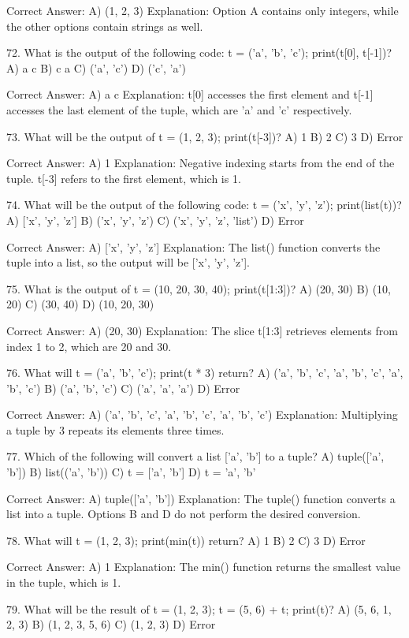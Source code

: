 Correct Answer: A) (1, 2, 3)
Explanation: Option A contains only integers, while the other options contain strings as well.

72. What is the output of the following code: t = ('a', 'b', 'c'); print(t[0], t[-1])?
A) a c
B) c a
C) ('a', 'c')
D) ('c', 'a')

Correct Answer: A) a c
Explanation: t[0] accesses the first element and t[-1] accesses the last element of the tuple, which are 'a' and 'c' respectively.

73. What will be the output of t = (1, 2, 3); print(t[-3])?
A) 1
B) 2
C) 3
D) Error

Correct Answer: A) 1
Explanation: Negative indexing starts from the end of the tuple. t[-3] refers to the first element, which is 1.

74. What will be the output of the following code: t = ('x', 'y', 'z'); print(list(t))?
A) ['x', 'y', 'z']
B) ('x', 'y', 'z')
C) ('x', 'y', 'z', 'list')
D) Error

Correct Answer: A) ['x', 'y', 'z']
Explanation: The list() function converts the tuple into a list, so the output will be ['x', 'y', 'z'].

75. What is the output of t = (10, 20, 30, 40); print(t[1:3])?
A) (20, 30)
B) (10, 20)
C) (30, 40)
D) (10, 20, 30)

Correct Answer: A) (20, 30)
Explanation: The slice t[1:3] retrieves elements from index 1 to 2, which are 20 and 30.

76. What will t = ('a', 'b', 'c'); print(t * 3) return?
A) ('a', 'b', 'c', 'a', 'b', 'c', 'a', 'b', 'c')
B) ('a', 'b', 'c')
C) ('a', 'a', 'a')
D) Error

Correct Answer: A) ('a', 'b', 'c', 'a', 'b', 'c', 'a', 'b', 'c')
Explanation: Multiplying a tuple by 3 repeats its elements three times.

77. Which of the following will convert a list ['a', 'b'] to a tuple?
A) tuple(['a', 'b'])
B) list(('a', 'b'))
C) t = ['a', 'b']
D) t = 'a', 'b'

Correct Answer: A) tuple(['a', 'b'])
Explanation: The tuple() function converts a list into a tuple. Options B and D do not perform the desired conversion.

78. What will t = (1, 2, 3); print(min(t)) return?
A) 1
B) 2
C) 3
D) Error

Correct Answer: A) 1
Explanation: The min() function returns the smallest value in the tuple, which is 1.

79. What will be the result of t = (1, 2, 3); t = (5, 6) + t; print(t)?
A) (5, 6, 1, 2, 3)
B) (1, 2, 3, 5, 6)
C) (1, 2, 3)
D) Error

